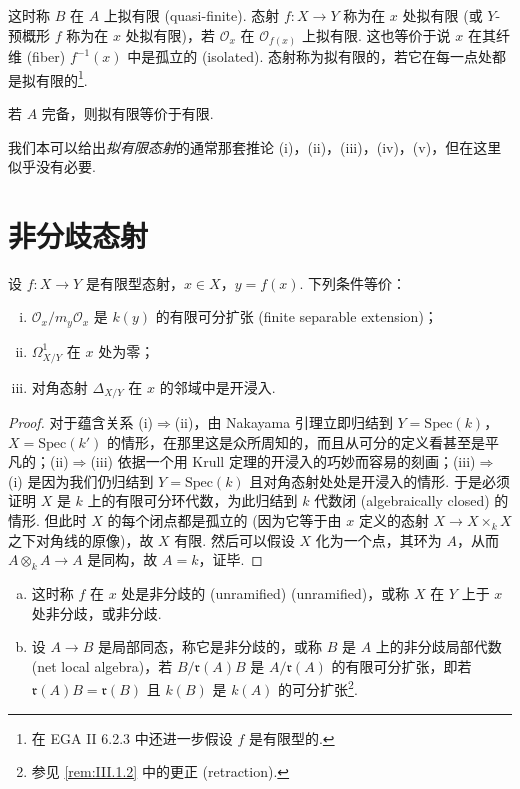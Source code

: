 这时称 $B$ 在 $A$ 上拟有限 (quasi-finite). 态射 $f \colon X \to Y$ 称为在 $x$ 处拟有限 (或 $Y$-预概形 $f$ 称为在 $x$ 处拟有限)，若 $\mathcal{O}_x$ 在 $\mathcal{O}_{f(x)}$ 上拟有限. 这也等价于说 $x$ 在其纤维 (fiber) $f^{-1}(x)$ 中是孤立的 (isolated). 态射称为拟有限的，若它在每一点处都是拟有限的\footnote{在 EGA II 6.2.3 中还进一步假设 $f$ 是有限型的.}.

\begin{corollary}\label{cor:I.2.2}
若 $A$ 完备，则拟有限等价于有限.
\end{corollary}

我们本可以给出\emph{拟有限态射}的通常那套推论 (i)，(ii)，(iii)，(iv)，(v)，但在这里似乎没有必要.

\section{非分歧态射}

\begin{proposition}\label{prop:I.3.1}
设 $f \colon X \to Y$ 是有限型态射，$x \in X$，$y = f(x)$. 下列条件等价：
\begin{enumerate}[(i)]
\item $\mathcal{O}_x / m_y \mathcal{O}_x$ 是 $k(y)$ 的有限可分扩张 (finite separable extension)；
\item $\varOmega_{X/Y}^{1}$ 在 $x$ 处为零；
\item 对角态射 $\Delta_{X/Y}$ 在 $x$ 的邻域中是开浸入.
\end{enumerate}
\end{proposition}

\begin{proof}
对于蕴含关系 (i)$\Rightarrow$(ii)，由 Nakayama 引理立即归结到 $Y = \mathrm{Spec}(k)$，$X = \mathrm{Spec}(k')$ 的情形，在那里这是众所周知的，而且从可分的定义看甚至是平凡的；(ii)$\Rightarrow$(iii) 依据一个用 Krull 定理的开浸入的巧妙而容易的刻画；(iii)$\Rightarrow$(i) 是因为我们仍归结到 $Y = \mathrm{Spec}(k)$ 且对角态射处处是开浸入的情形. 于是必须证明 $X$ 是 $k$ 上的有限可分环代数，为此归结到 $k$ 代数闭 (algebraically closed) 的情形. 但此时 $X$ 的每个闭点都是孤立的 (因为它等于由 $x$ 定义的态射 $X \to X \times_k X$ 之下对角线的原像)，故 $X$ 有限. 然后可以假设 $X$ 化为一个点，其环为 $A$，从而 $A \otimes_k A \to A$ 是同构，故 $A = k$，证毕.
\end{proof}

\begin{definition}\label{def:I.3.2}
\begin{enumerate}[a)]
\item 这时称 $f$ 在 $x$ 处是非分歧的 (unramified) (unramified)，或称 $X$ 在 $Y$ 上于 $x$ 处非分歧，或非分歧.
\item 设 $A \to B$ 是局部同态，称它是非分歧的，或称 $B$ 是 $A$ 上的非分歧局部代数 (net local algebra)，若 $B/\mathfrak{r}(A)B$ 是 $A/\mathfrak{r}(A)$ 的有限可分扩张，即若 $\mathfrak{r}(A)B = \mathfrak{r}(B)$ 且 $k(B)$ 是 $k(A)$ 的可分扩张\footnote{参见 \ref{rem:III.1.2} 中的更正 (retraction).}.
\end{enumerate}
\end{definition}

